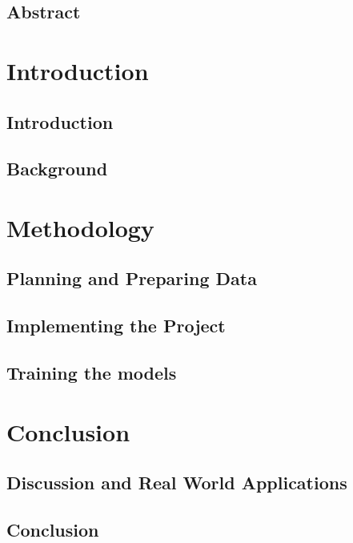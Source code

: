 \documentclass[UKenglish]{ifimaster}
\title{\problemStatement}
\subtitle{
}
\author{Joakim I. Frogner}
\begin{document}
\duoforside[dept={Department of Informatics},
program={Programming and Networks},
long]

\frontmatter{}
\chapter*{Abstract}

\tableofcontents{} 
\listoffigures{}
\listoftables{}

\mainmatter{}
\part{Introduction}

\chapter{Introduction}


\chapter{Background}



\part{Methodology}
\chapter{Planning and Preparing Data}


\chapter{Implementing the Project}


\chapter{Training the models}


\part{Conclusion}
\chapter{Discussion and Real World Applications}


\chapter{Conclusion}


\backmatter{}
\printbibliography
\end{document}
